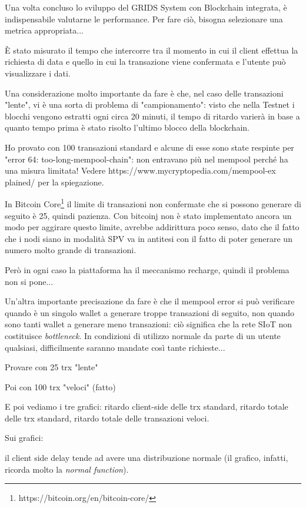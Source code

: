 Una volta concluso lo sviluppo del GRIDS System con Blockchain integrata, è indispensabile valutarne le performance.
Per fare ciò, bisogna selezionare una metrica appropriata...


È stato misurato il tempo che intercorre tra il momento in cui il client effettua la richiesta di data e quello in cui la transazione viene confermata e l'utente può visualizzare i dati.

Una considerazione molto importante da fare è che, nel caso delle transazioni "lente", vi è una sorta di problema di "campionamento": visto che nella Testnet i blocchi vengono estratti ogni circa 20 minuti, il tempo di ritardo varierà in base a quanto tempo prima è stato risolto l'ultimo blocco della blockchain.

Ho provato con 100 transazioni standard e alcune di esse sono state respinte per "error 64: too-long-mempool-chain": non entravano più nel mempool perché ha una misura limitata! Vedere https://www.mycryptopedia.com/mempool-ex plained/ per la spiegazione.

In Bitcoin Core\footnote{https://bitcoin.org/en/bitcoin-core/} il limite di transazioni non confermate che si possono generare di seguito è 25, quindi pazienza. Con bitcoinj non è stato implementato ancora un modo per aggirare questo limite, avrebbe addirittura poco senso, dato che il fatto che i nodi siano in modalità SPV va in antitesi con il fatto di poter generare un numero molto grande di transazioni.

Però in ogni caso la piattaforma ha il meccanismo recharge, quindi il problema non si pone...

Un'altra importante precisazione da fare è che il mempool error si può verificare quando è un singolo wallet a generare troppe transazioni di seguito, non quando sono tanti wallet a generare meno transazioni: ciò significa che la rete SIoT non costituisce \textit{bottleneck}. In condizioni di utilizzo normale da parte di un utente qualsiasi, difficilmente saranno mandate così tante richieste...

Provare con 25 trx "lente"

Poi con 100 trx "veloci" (fatto)

E poi vediamo i tre grafici: ritardo client-side delle trx standard, ritardo totale delle trx standard, ritardo totale delle transazioni veloci.

Sui grafici: 

il client side delay tende ad avere una distribuzione normale (il grafico, infatti, ricorda molto la \textit{normal function}). 

